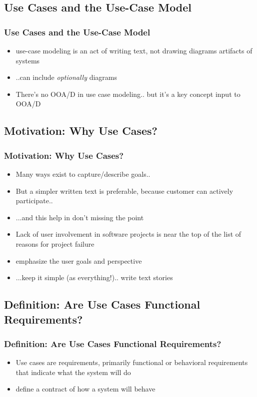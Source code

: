 \documentclass{beamer}
\begin{document}
\subsection{Use Cases and the Use-Case Model}
\begin{frame}
	\frametitle{Use Cases and the Use-Case Model}
	\begin{itemize}
		\item<+-> use-case modeling is an act of writing text, not drawing diagrams artifacts of systems
		\item<+-> ..can include \textit{optionally} diagrams
		\item<+-> There's no OOA/D in use case modeling.. but it's a key concept input to OOA/D
    \end{itemize}
\end{frame}

\subsection{Motivation: Why Use Cases?}
\begin{frame}
	\frametitle{Motivation: Why Use Cases?}
	\begin{itemize}
		\item<+-> Many ways exist to capture/describe goals..
		\item<+-> But a simpler written text is preferable, because customer can actively participate..  
		\item<+-> ...and this help in don't missing the point 
		\item<+-> Lack of user involvement in software projects is near the top of the list of reasons for project failure
		\item<+-> emphasize the user goals and perspective
		\item<+-> ...keep it simple (as everything!).. write text stories
    \end{itemize}
\end{frame}

\subsection{Definition: Are Use Cases Functional Requirements?} 
\begin{frame}
	\frametitle{Definition: Are Use Cases Functional Requirements?}
	\begin{itemize}
    \item<+-> Use cases are requirements, primarily functional or behavioral requirements that indicate what
the system will do
    \item<+-> define a contract of how a system will behave
    \end{itemize}
\end{frame}
\end{document}
